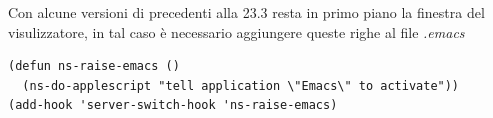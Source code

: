 \documentclass[11pt,a4paper]{article}
\begin{document}
Con alcune versioni di \emacs{} precedenti alla 23.3 resta in primo
piano la finestra del visulizzatore, in tal caso è necessario
aggiungere queste righe al file \emph{.emacs}
\begin{Verbatim}
(defun ns-raise-emacs ()
  (ns-do-applescript "tell application \"Emacs\" to activate"))
(add-hook 'server-switch-hook 'ns-raise-emacs)
\end{Verbatim}







\end{document}
